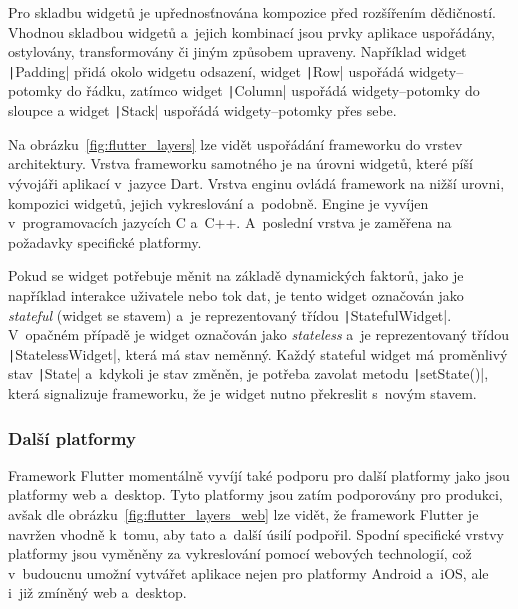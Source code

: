 Pro skladbu widgetů je upřednosťnována kompozice před rozšířením dědičností.
Vhodnou skladbou widgetů a~jejich kombinací jsou prvky aplikace uspořádány,
ostylovány, transformovány či jiným způsobem upraveny.
Například widget \texttt|Padding| přidá okolo widgetu odsazení,
widget \texttt|Row| uspořádá widgety--potomky do řádku,
zatímco widget \texttt|Column| uspořádá widgety--potomky
do sloupce a widget \texttt|Stack| uspořádá widgety--potomky
přes sebe.~\cite{flutter_technical_overview}\pagebreak

Na obrázku~\ref{fig:flutter_layers} lze vidět uspořádání frameworku do vrstev
architektury.
Vrstva frameworku samotného je na úrovni widgetů,
které píší vývojáři aplikací v~jazyce Dart.
Vrstva enginu ovládá framework na nižší urovni, kompozici widgetů,
jejich vykreslování a~podobně.
Engine je vyvíjen v~programovacích jazycích C a~C++.
A~poslední vrstva je zaměřena na požadavky specifické
platformy.~\cite{flutter_technical_overview}

Pokud se widget potřebuje měnit na základě dynamických faktorů,
jako je například interakce uživatele nebo tok dat,
je tento widget označován jako \emph{stateful} (widget se stavem) a~je
reprezentovaný třídou \texttt|StatefulWidget|.
V~opačném případě je widget označován jako \emph{stateless} a~je 
reprezentovaný třídou \texttt|StatelessWidget|,
která má stav neměnný.
Každý stateful widget má proměnlivý stav \texttt|State|
a~kdykoli je stav změněn,
je potřeba zavolat metodu \texttt|setState()|,
která signalizuje frameworku,
že je widget nutno překreslit s~novým stavem.~\cite{flutter_technical_overview}

\subsubsection*{Další platformy}

Framework Flutter momentálně vyvíjí také podporu pro
další platformy jako jsou platformy web a~desktop.
Tyto platformy jsou zatím podporovány pro produkci,
avšak dle obrázku~\ref{fig:flutter_layers_web} lze vidět,
že framework Flutter je navržen vhodně k~tomu,
aby tato a~další úsilí podpořil.
Spodní specifické vrstvy platformy jsou vyměněny za vykreslování pomocí
webových technologií,
což v~budoucnu umožní vytvářet aplikace nejen pro platformy Android a~iOS,
ale i~již zmíněný web a~desktop.~\cite{flutter_web, flutter_desktop} 

